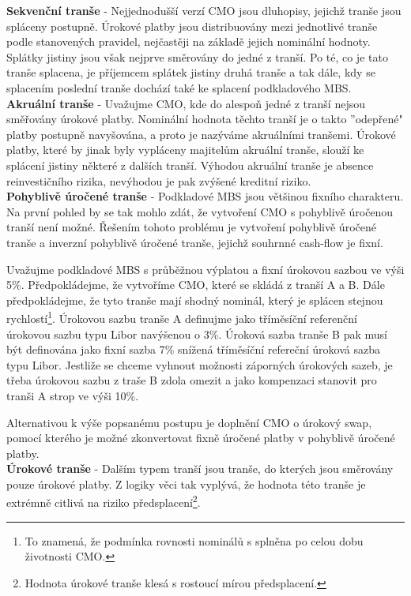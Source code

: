 \documentclass[a4paper]{book}
\begin{document}
\noindent \textbf{Sekvenční tranše} - Nejjednodušší verzí CMO jsou dluhopisy, jejichž tranše jsou spláceny postupně. Úrokové platby jsou distribuovány mezi jednotlivé tranše podle stanovených pravidel, nejčastěji na základě jejich nominální hodnoty. Splátky jistiny jsou však nejprve směrovány do jedné z tranší. Po té, co je tato tranše splacena, je příjemcem splátek jistiny druhá tranše a tak dále, kdy se splacením poslední tranše dochází také ke splacení podkladového MBS.\\

\noindent \textbf{Akruální tranše} - Uvažujme CMO, kde do alespoň jedné z tranší nejsou směřovány úrokové platby. Nominální hodnota těchto tranší je o takto ''odepřené" platby postupně navyšována, a proto je nazýváme akruálními tranšemi. Úrokové platby, které by jinak byly vypláceny majitelům akruální tranše, slouží ke splácení jistiny některé z dalších tranší. Výhodou akruální tranše je absence reinvestičního rizika, nevýhodou je pak zvýšené kreditní riziko.\\

\noindent \textbf{Pohyblivě úročené tranše} - Podkladové MBS jsou většinou fixního charakteru. Na první pohled by se tak mohlo zdát, že vytvoření CMO s pohyblivě úročenou tranší není možné. Řešením tohoto problému je vytvoření pohyblivě úročené tranše a inverzní pohyblivě úročené tranše, jejichž souhrnné cash-flow je fixní.

Uvažujme podkladové MBS s průběžnou výplatou a fixní úrokovou sazbou ve výši 5\%. Předpokládejme, že vytvoříme CMO, které se skládá z tranší A a B. Dále předpokládejme, že tyto tranše mají shodný nominál, který je splácen stejnou rychlostí\footnote{To znamená, že podmínka rovnosti nominálů s splněna po celou dobu životnosti CMO.}. Úrokovou sazbu tranše A definujme jako tříměsíční referenční úrokovou sazbu typu Libor navýšenou o 3\%. Úroková sazba tranše B pak musí být definována jako fixní sazba 7\% snížená tříměsíční refereční úroková sazba typu Libor. Jestliže se chceme vyhnout možnosti záporných úrokových sazeb, je třeba úrokovou sazbu z traše B zdola omezit a jako kompenzaci stanovit pro tranši A strop ve výši 10\%.

Alternativou k výše popsanému postupu je doplnění CMO o úrokový swap, pomocí kterého je možné zkonvertovat fixně úročené platby v pohyblivě úročené platby.\\

\noindent \textbf{Úrokové tranše} - Dalším typem tranší jsou tranše, do kterých jsou směrovány pouze úrokové platby. Z logiky věci tak vyplývá, že hodnota této tranše je extrémně citlivá na riziko předsplacení\footnote{Hodnota úrokové tranše klesá s rostoucí mírou předsplacení.}.
\end{document}
